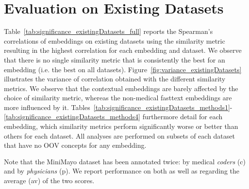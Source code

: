 \documentclass[letterpaper]{article} %
\begin{document}
\clearpage
\section{Evaluation on Existing Datasets}
Table~\ref{tab:significance_existingDatasets_full} reports the Spearman's correlations of embeddings on existing datasets using the similarity metric resulting in the highest correlation for each embedding and dataset.
We observe that there is no single similarity metric that is consistently the best for an embedding (i.e. the best on all datasets). 
Figure~\ref{fig:variance_existingDatasets} illustrates the variance of correlation obtained with the different similarity metrics. We observe that the contextual embeddings are barely affected by the choice of similarity metric, whereas the non-medical fasttext embeddings are more influenced by it. 
Tables~\ref{tab:significance_existingDatasets_methods1}-\ref{tab:significance_existingDatasets_methods4} furthermore detail for each embedding, which similarity metrics perform significantly worse or better than others for each dataset.
All analyses are performed on subsets of each dataset that have no OOV concepts for any embedding.

Note that the MiniMayo dataset has been annotated twice: by medical \emph{coders} (c) and by \emph{physicians} (p). We report performance on both as well as regarding the average (av) of the two scores.
\end{document}
